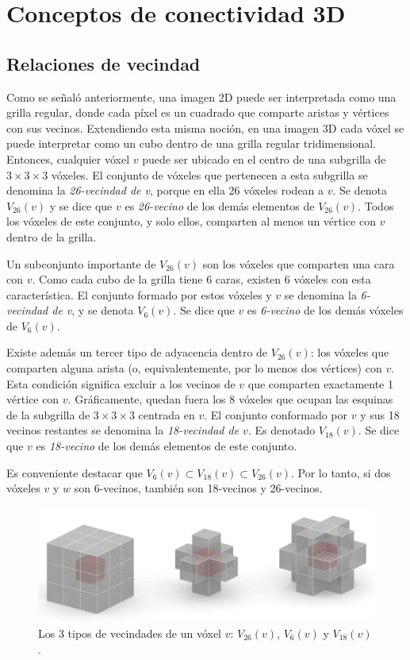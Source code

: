 
\section{Conceptos de conectividad 3D}

\subsection{Relaciones de vecindad}
Como se señaló anteriormente, una imagen 2D puede ser interpretada como una grilla regular, donde cada píxel es un cuadrado que comparte aristas y vértices con sus vecinos. Extendiendo esta misma noción, en una imagen 3D cada vóxel se puede interpretar como un cubo dentro de una grilla regular tridimensional. Entonces, cualquier vóxel $v$ puede ser ubicado en el centro de una subgrilla de $3\times3\times3$ vóxeles. El conjunto de vóxeles que pertenecen a esta subgrilla se denomina la \textit{26-vecindad de v}, porque en ella 26 vóxeles rodean a $v$. Se denota $V_{26}(v)$ y se dice que $v$ es \textit{26-vecino} de los demás elementos de $V_{26}(v)$. Todos los vóxeles de este conjunto, y solo ellos, comparten al menos un vértice con $v$ dentro de la grilla.

Un subconjunto importante de $V_{26}(v)$ son los vóxeles que comparten una cara con $v$. Como cada cubo de la grilla tiene 6 caras, existen 6 vóxeles con esta característica. El conjunto formado por estos vóxeles y $v$ se denomina la \textit{6-vecindad de v}, y se denota $V_6(v)$. Se dice que $v$ es \textit{6-vecino} de los demás vóxeles de $V_6(v)$.

Existe además un tercer tipo de adyacencia dentro de $V_{26}(v)$: los vóxeles que comparten alguna arista (o, equivalentemente, por lo menos dos vértices) con $v$. Esta condición significa excluir a los vecinos de $v$ que comparten exactamente 1 vértice con $v$. Gráficamente, quedan fuera los 8 vóxeles que ocupan las esquinas de la subgrilla de $3\times3\times3$ centrada en $v$. El conjunto conformado por $v$ y sus 18 vecinos restantes se denomina la \textit{18-vecindad de $v$}. Es denotado $V_{18}(v)$. Se dice que $v$ es \textit{18-vecino} de los demás elementos de este conjunto. 

Es conveniente destacar que $V_{6}(v) \subset V_{18}(v) \subset V_{26}(v)$. Por lo tanto, si dos vóxeles $v$ y $w$ son 6-vecinos, también son 18-vecinos y 26-vecinos.

\begin{figure}[ht]\centering
\includegraphics[width=0.8\linewidth]{images/3dneighborhoods}
\caption{Los 3 tipos de vecindades de un vóxel $v$: $V_{26}(v)$, $V_{6}(v)$ y $V_{18}(v)$.}
\label{fig:3dneighborhoods}
\end{figure}


